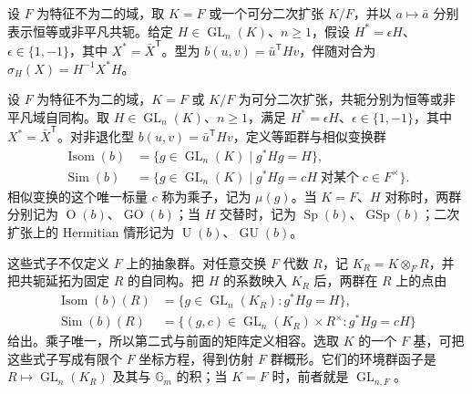 设 \(F\) 为特征不为二的域，取 \(K=F\) 或一个可分二次扩张 \(K/F\)，并以 \(a\mapsto\bar a\) 分别表示恒等或非平凡共轭。给定 \(H\in\operatorname{GL}_n(K)\)、\(n\ge1\)，假设 \(H^*=\epsilon H\)、\(\epsilon\in\{1,-1\}\)，其中 \(X^*=\bar X^{\mathsf T}\)。型为 \(b(u,v)=\bar u^{\mathsf T}Hv\)，伴随对合为 \(\sigma_H(X)=H^{-1}X^*H\)。
\begin{definition}\label{b5:def:classical-similitude}
	设 \(F\) 为特征不为二的域，\(K=F\) 或 \(K/F\) 为可分二次扩张，共轭分别为恒等或非平凡域自同构。取 \(H\in\operatorname{GL}_n(K)\)、\(n\ge1\)，满足 \(H^*=\epsilon H\)、\(\epsilon\in\{1,-1\}\)，其中 \(X^*=\bar X^{\mathsf T}\)。对非退化型 \(b(u,v)=\bar u^{\mathsf T}Hv\)，定义等距群与相似变换群
	\[
		\begin{aligned}
			\operatorname{Isom}(b)&=\bigl\{g\in\operatorname{GL}_n(K)\mid g^*Hg=H\bigr\},\\
			\operatorname{Sim}(b)&=\bigl\{g\in\operatorname{GL}_n(K)\mid g^*Hg=cH\;\text{对某个}\;c\in F^\times\bigr\}.
		\end{aligned}
	\]
	相似变换的这个唯一标量 \(c\) 称为乘子，记为 \(\mu(g)\)。当 \(K=F\)、\(H\) 对称时，两群分别记为 \(\operatorname O(b)\)、\(\operatorname{GO}(b)\)；当 \(H\) 交替时，记为 \(\operatorname{Sp}(b)\)、\(\operatorname{GSp}(b)\)；二次扩张上的 Hermitian 情形记为 \(\operatorname U(b)\)、\(\operatorname{GU}(b)\)。
\end{definition}
这些式子不仅定义 \(F\) 上的抽象群。对任意交换 \(F\) 代数 \(R\)，记 \(K_R=K\otimes_FR\)，并把共轭延拓为固定 \(R\) 的自同构。把 \(H\) 的系数映入 \(K_R\) 后，两群在 \(R\) 上的点由
\[
	\begin{aligned}
		\operatorname{Isom}(b)(R) &=\{g\in\operatorname{GL}_n(K_R):g^*Hg=H\},\\
		\operatorname{Sim}(b)(R) &=\{(g,c)\in\operatorname{GL}_n(K_R)\times R^\times:g^*Hg=cH\}
	\end{aligned}
\]
给出。乘子唯一，所以第二式与前面的矩阵定义相容。选取 \(K\) 的一个 \(F\) 基，可把这些式子写成有限个 \(F\) 坐标方程，得到仿射 \(F\) 群概形。它们的环境群函子是 \(R\mapsto\operatorname{GL}_n(K_R)\) 及其与 \(\mathbb G_m\) 的积；当 \(K=F\) 时，前者就是 \(\operatorname{GL}_{n,F}\)。

\ProseParagraphBreak

